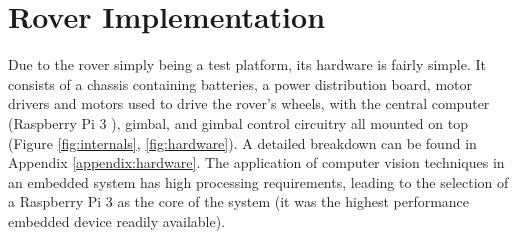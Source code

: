 \chapter{Rover Implementation}
\label{chapter:rover}

Due to the rover simply being a test platform, its hardware is fairly simple. It consists of a chassis containing batteries, a power distribution board, motor drivers and motors used to drive the rover's wheels, with the central computer (Raspberry Pi 3 \cite{pi}), gimbal, and gimbal control circuitry all mounted on top (Figure \ref{fig:internals}, \ref{fig:hardware}). A detailed breakdown can be found in Appendix \ref{appendix:hardware}. The application of computer vision techniques in an embedded system has high processing requirements, leading to the selection of a Raspberry Pi 3 as the core of the system (it was the highest performance embedded device readily available). 


